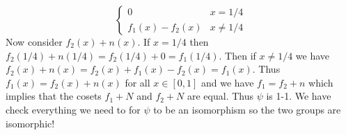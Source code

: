 \documentclass[11pt]{article}
\begin{document}
\begin{exercise}{87}{2}
{\[\begin{cases}
            0 & x = 1/4 \\
            f_1(x)-f_2(x) & x \neq 1/4
        \end{cases}
        \]
        Now consider $f_2(x) + n(x)$.
        If $x = 1/4$ then $f_2(1/4) + n(1/4) = f_2 (1/4) + 0 = f_1 (1/4)$.
        Then if $x \neq 1/4$ we have $f_2 (x) + n(x) = f_2 (x) + f_1 (x) - f_2 (x) = f_1 (x)$.
        Thus $f_1 (x) = f_2 (x) + n(x)$ for all $x \in [0,1]$ and we have $f_1 = f_2 + n$ which implies that the cosets $f_1 + N$ and $f_2 + N$ are equal.
        Thus $\psi$ is 1-1. \parspace
        We have check everything we need to for $\psi$ to be an isomorphism so the two groups are isomorphic!
    }
\end{exercise}


\newpage
\end{document}
